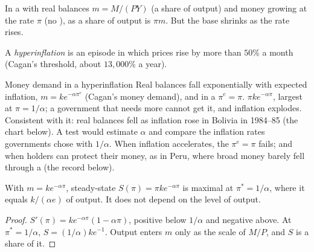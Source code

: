 In a  with real balances $m = M/(PY)$ (a share of output) and
money growing at the rate $\pi$ (no ),  as a share of
output is $\pi m$. But the base shrinks as the rate rises.

\begin{definition}[Hyperinflation]\label{def:b1:money-and-inflation:hyperinflation}
A \emph{hyperinflation} is an episode in which prices rise by more than
$50\%$ a month (Cagan's threshold, about $13{,}000\%$ a
year). %
\end{definition}

\begin{model}{Money demand in a hyperinflation}
\assumes Real balances fall exponentially with expected inflation,
$m = k e^{-\alpha\pi^e}$ (Cagan's money demand), and in a  $\pi^e = \pi$.
\predicts {} $\pi k e^{-\alpha\pi}$, largest at $\pi = 1/\alpha$; a government that needs more
cannot get it, and inflation explodes.
\tested Consistent with it: real balances fell as inflation rose in Bolivia
in 1984--85 (the chart below). A test would estimate $\alpha$ and compare the
inflation rates governments chose with $1/\alpha$.
\breaks When inflation accelerates, the  $\pi^e = \pi$ fails; and
when holders can protect their money, as in Peru, where broad money barely
fell through a  (the record below).
\end{model}

\begin{proposition}\label{prop:b1:money-and-inflation:laffer}
With $m = ke^{-\alpha\pi}$, steady-state  $S(\pi) = \pi k e^{-\alpha\pi}$ is maximal at $\pi^* = 1/\alpha$, where
it equals $k/(\alpha e)$ of output. It does not depend on the level of output.
\end{proposition}

\begin{proof}
$S'(\pi) = ke^{-\alpha\pi}(1 - \alpha\pi)$, positive below $1/\alpha$ and negative above. At $\pi^* = 1/\alpha$,
$S = (1/\alpha)ke^{-1}$. Output enters $m$ only as the scale of $M/P$, and $S$ is a share of it.
\end{proof}

